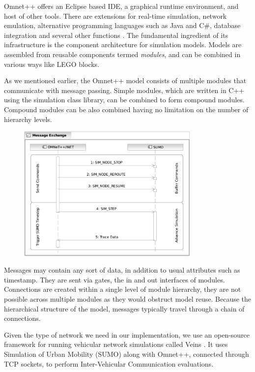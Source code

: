 Omnet++ offers an Eclipse based IDE, a graphical runtime environment, and host
of other tools. There are extensions for real-time simulation, network
emulation, alternative programming languages such as Java and C\#, database
integration and several other functions \cite{omnetpp}. The fundamental
ingredient of its infrastructure is the component architecture for simulation
models. Models are assembled from reusable components termed {\it modules}, and
can be combined in various ways like LEGO blocks.

As we mentioned earlier, the Omnet++ model consists of multiple modules that
communicate with message passing. Simple modules, which are written in C++ using
the simulation class library, can be combined to form compound modules. Compound
modules can be also combined having no limitation on the number of hierarchy
levels.

\begin{figure}[t]
	\centering
	\includegraphics[width=0.8\textwidth]{img/bidirectional_com}
\end{figure}

Messages may contain any sort of data, in addition to usual attributes such as
timestamp. They are sent via gates, the in and out interfaces of modules.
Connections are created within a single level of module hierarchy, they are not
possible across multiple modules as they would obstruct model reuse. Because the
hierarchical structure of the model, messages typically travel through a chain
of connections.

Given the type of network we need in our implementation, we use an
open-source framework for running vehicular network simulations called Veins \cite{veins}.
It uses Simulation of Urban Mobility (SUMO) along with Omnet++, connected
through TCP sockets, to perform Inter-Vehicular Communication evaluations.

